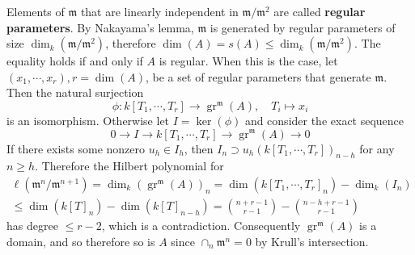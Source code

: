 \documentclass[leqno]{amsart}
\DeclareMathOperator{\gr}{gr}
\newcommand{\1}{\mathbf{1}}
\newcommand{\fm}{\mathfrak m}
\theoremstyle{definition}
\theoremstyle{remark}
\begin{document}
Elements of $\fm$ that are linearly independent in  $\fm/\fm^2$
are called \textbf{regular parameters}.
By Nakayama's lemma, 
$\fm$ is generated by regular parameters 
of size $\dim_k(\fm/\fm^2)$,
therefore  $\dim(A)=s(A)\leq \dim_k(\fm/\fm^2)$.
The equality holds if and only if  $A$ is regular.
When this is the case,
let $(x_1,\cdots,x_r), r=\dim(A)$,
be a set of regular parameters that generate $\fm$.
Then the natural surjection
\[
	\phi\colon k[T_1,\cdots,T_r]\to \gr^{\fm}(A),\quad T_i\mapsto x_i
\]
is an isomorphism.
Otherwise let $I=\ker(\phi)$ and consider the exact sequence
\[
	0\to I\to k[T_1,\cdots,T_r]\to \gr^{\fm}(A)\to 0
\]
If there exists some nonzero $u_h\in I_h$, then
$I_n\supset u_h(k[T_1,\cdots,T_r])_{n-h}$ for any $n\geq h$.
Therefore the Hilbert polynomial for
\begin{multline*}
	\ell(\fm^n/\fm^{n+1})=
	\dim_k(\gr^{\fm}(A))_n=\dim(k[T_1,\cdots,T_r]_n)-\dim_k(I_n)
	\\\leq
	\dim(k[T]_n)-\dim(k[T]_{n-h})=
	\binom{n+r-1}{r-1}-
	\binom{n-h+r-1}{r-1}
\end{multline*}
has degree $\leq r-2$, which is a contradiction.
Consequently $\gr^{\fm}(A)$ is a domain,
and so therefore so is  $A$ since  $\cap_n\fm^n=0$ 
by Krull's intersection.
\end{document}

